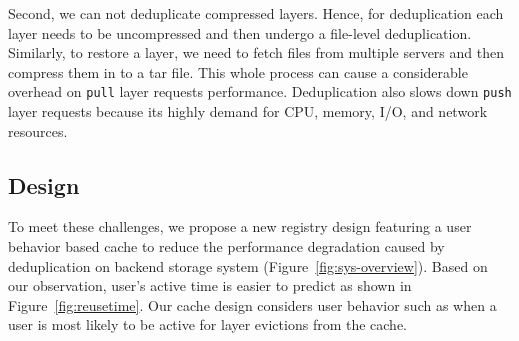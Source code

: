 %
Second, we can not deduplicate compressed layers. Hence, for deduplication each layer
needs to be uncompressed and then undergo a file-level deduplication. Similarly,
to restore a layer, we need to fetch files from multiple servers and then compress
them in to a tar file. 
This whole process can cause a 
considerable overhead on \texttt{pull} layer requests performance.
Deduplication also slows down
\texttt{push} layer requests because its highly demand for CPU, memory, I/O, and network resources.

\subsection{Design}
To meet these challenges, we propose a new registry design featuring a user
behavior based cache to reduce the performance degradation caused by
deduplication on backend storage system (Figure~\ref{fig:sys-overview}).  Based
on our observation, user's active time is easier to predict as shown in
Figure~\ref{fig:reusetime}. Our cache design considers user
behavior such as when a user is most likely to be active for
layer evictions from the cache.


